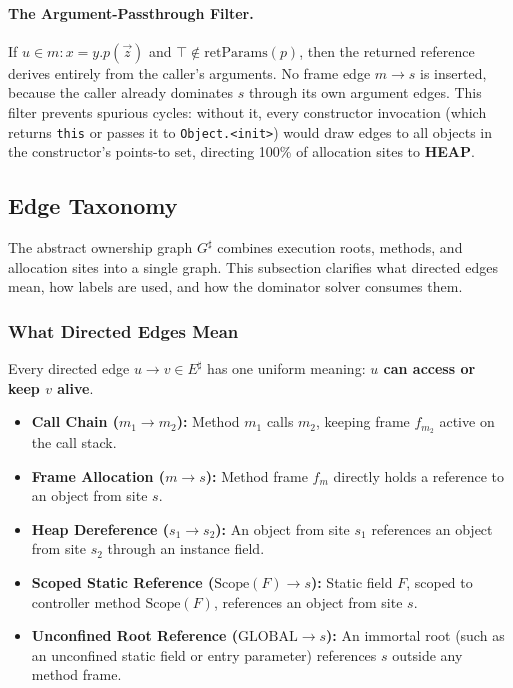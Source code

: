 \documentclass[12pt,a4paper]{article}
\newcommand{\HEAP}{\textbf{HEAP}}
\newcommand{\GLOBAL}{\text{GLOBAL}}
\newcommand{\retParams}{\text{retParams}}
\newcommand{\Scope}{\text{Scope}}
\begin{document}
\paragraph{The Argument-Passthrough Filter.} If $u \in m: x = y.p(\vec{z})$ and $\top \notin \retParams(p)$, then the returned reference derives entirely from the caller's arguments. No frame edge $m \to s$ is inserted, because the caller already dominates $s$ through its own argument edges. This filter prevents spurious cycles: without it, every constructor invocation (which returns \texttt{this} or passes it to \texttt{Object.<init>}) would draw edges to all objects in the constructor's points-to set, directing 100\% of allocation sites to \HEAP{}.

\subsection{Edge Taxonomy}
\label{sec:edge-taxonomy}

The abstract ownership graph $G^\sharp$ combines execution roots, methods, and allocation sites into a single graph. This subsection clarifies what directed edges mean, how labels are used, and how the dominator solver consumes them.

\subsubsection{What Directed Edges Mean}

Every directed edge $u \to v \in E^\sharp$ has one uniform meaning: \textbf{$u$ can access or keep $v$ alive}.

\begin{itemize}
  \item \textbf{Call Chain ($m_1 \to m_2$):} Method $m_1$ calls $m_2$, keeping frame $f_{m_2}$ active on the call stack.
  \item \textbf{Frame Allocation ($m \to s$):} Method frame $f_m$ directly holds a reference to an object from site $s$.
  \item \textbf{Heap Dereference ($s_1 \to s_2$):} An object from site $s_1$ references an object from site $s_2$ through an instance field.
  \item \textbf{Scoped Static Reference ($\Scope(F) \to s$):} Static field $F$, scoped to controller method $\Scope(F)$, references an object from site $s$.
  \item \textbf{Unconfined Root Reference ($\GLOBAL \to s$):} An immortal root (such as an unconfined static field or entry parameter) references $s$ outside any method frame.
\end{itemize}
\end{document}
